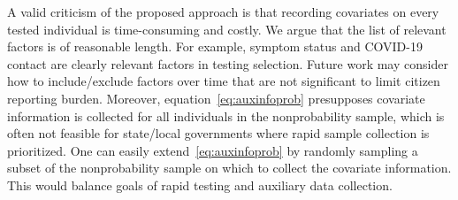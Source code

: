 \documentclass[11pt]{amsart}
\numberwithin{equation}{section}
\theoremstyle{plain}
\def\pr{\text{pr}}
\begin{document}
 A valid criticism of the proposed approach is that recording covariates on every tested individual is time-consuming and costly.  We argue that the list of relevant factors is of reasonable length.  For example, symptom status and COVID-19 contact are clearly relevant factors in testing selection.  Future work may consider how to include/exclude factors over time that are not significant to limit citizen reporting burden.  Moreover, equation~\eqref{eq:auxinfoprob} presupposes covariate information is collected for all individuals in the nonprobability sample, which is often not feasible for state/local governments where rapid sample collection is prioritized.  One can easily extend~\eqref{eq:auxinfoprob} by randomly sampling a subset of the nonprobability sample on which to collect the covariate information.
 This would balance goals of rapid testing and auxiliary data collection.

\newpage







\end{document}

